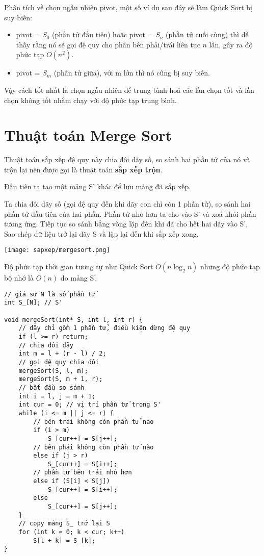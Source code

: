 Phân tích về chọn ngẫu nhiên pivot, một số ví dụ sau đây sẽ làm Quick Sort bị suy biến:
\begin{itemize}
    \item pivot = $S_0$ (phần tử đầu tiên) hoặc pivot = $S_n$ (phần tử cuối cùng) thì dễ thấy rằng nó sẽ gọi đệ quy cho phần bên phải/trái liên tục $n$ lần, gây ra độ phức tạp $O(n^2)$.
    \item pivot = $S_m$ (phần tử giữa), với m lớn thì nó cũng bị suy biến.
\end{itemize}
Vậy cách tốt nhất là chọn ngẫu nhiên để trung bình hoá các lần chọn tốt và lần chọn không tốt nhằm chạy với độ phức tạp trung bình.

\section{Thuật toán Merge Sort}
Thuật toán sắp xếp đệ quy này chia đôi dãy số, so sánh hai phần tử của nó và trộn lại nên được gọi là thuật toán \textbf{sắp xếp trộn}.

Đầu tiên ta tạo một mảng S' khác để lưu mảng đã sắp xếp.

Ta chia đôi dãy số (gọi đệ quy đến khi dãy con chỉ còn 1 phần tử), so sánh hai phần tử đầu tiên của hai phần. Phần tử nhỏ hơn ta cho vào S' và xoá khỏi phần tương ứng. Tiếp tục so sánh bằng vòng lặp đến khi đã cho hết hai dãy vào S', Sao chép dữ liệu trở lại dãy S và lặp lại đến khi sắp xếp xong.

\texttt{[image: sapxep/mergesort.png]}

Độ phức tạp thời gian tương tự như Quick Sort $O(n\log_2n)$ nhưng độ phức tạp bộ nhớ là $O(n)$ do mảng S'.

\begin{verbatim}
// giả sử N là số phần tử
int S_[N]; // S'

void mergeSort(int* S, int l, int r) {
    // dãy chỉ gồm 1 phần tử, điều kiện dừng đệ quy
    if (l >= r) return;
    // chia đôi dãy
    int m = l + (r - l) / 2;
    // gọi đệ quy chia đôi
    mergeSort(S, l, m);
    mergeSort(S, m + 1, r);
    // bắt đầu so sánh
    int i = l, j = m + 1;
    int cur = 0; // vị trí phần tử trong S'
    while (i <= m || j <= r) {
        // bên trái không còn phần tử nào
        if (i > m)
            S_[cur++] = S[j++];
        // bên phải không còn phần tử nào
        else if (j > r)
            S_[cur++] = S[i++];
        // phần tử bên trái nhỏ hơn
        else if (S[i] < S[j])
            S_[cur++] = S[i++];
        else
            S_[cur++] = S[j++];
    }
    // copy mảng S_ trở lại S
    for (int k = 0; k < cur; k++)
        S[l + k] = S_[k];
}
\end{verbatim}

